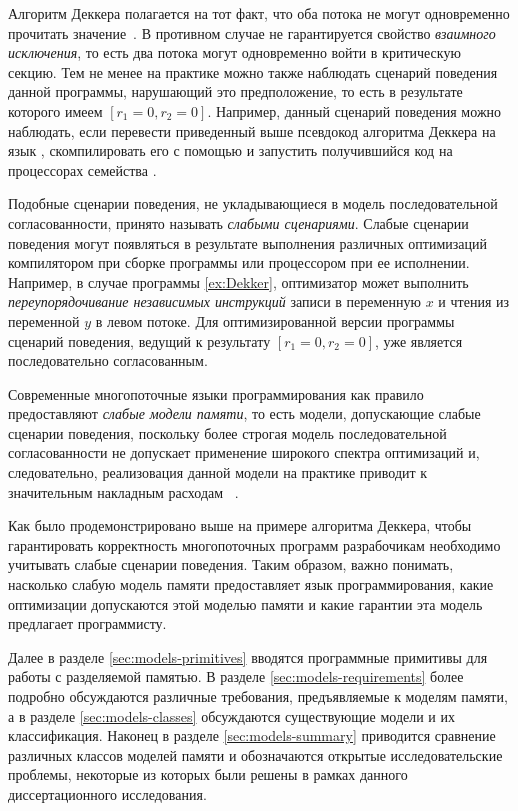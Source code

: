 Алгоритм Деккера полагается на тот факт, что оба 
потока не могут одновременно прочитать значение~.
В противном случае не гарантируется свойство \emph{взаимного исключения}, 
то есть два потока могут одновременно войти в критическую секцию. 
Тем не менее на практике можно также наблюдать
сценарий поведения данной программы, нарушающий это предположение, 
то есть в результате которого имеем ${[r_1=0,r_2=0]}$.
Например, данный сценарий поведения можно наблюдать,
если перевести приведенный выше псевдокод алгоритма Деккера
на язык \CLANG, скомпилировать его с помощью \GCC
и запустить получившийся код на процессорах семейства \IntelX.

Подобные сценарии поведения, 
не укладывающиеся в модель последовательной согласованности, 
принято называть \emph{слабыми сценариями}.
Слабые сценарии поведения могут появляться 
в результате выполнения различных оптимизаций 
компилятором при сборке программы или процессором при ее исполнении. 
Например, в случае программы \ref{ex:Dekker}, оптимизатор может выполнить 
\emph{переупорядочивание независимых инструкций} 
записи в переменную $x$ и чтения из переменной $y$ в левом потоке.
Для оптимизированной версии программы сценарий поведения, 
ведущий к результату ${[r_1=0, r_2=0]}$, уже является последовательно согласованным.

Современные многопоточные языки программирования 
как правило предоставляют \emph{слабые модели памяти},
то есть модели, допускающие слабые сценарии поведения,
поскольку более строгая модель последовательной согласованности
не допускает применение широкого спектра оптимизаций
и, следовательно, реализовация данной модели на практике
приводит к значительным накладным расходам%
~\cite{Marino-al:PLDI11,Singh-al:ISCA12,Liu-al:OOPSLA17,Liu-al:PLDI19}. 

Как было продемонстрировано выше на примере алгоритма Деккера, 
чтобы гарантировать корректность многопоточных программ
разрабочикам необходимо учитывать слабые сценарии поведения.
Таким образом, важно понимать, насколько слабую модель памяти
предоставляет язык программирования, какие оптимизации 
допускаются этой моделью памяти и какие гарантии 
эта модель предлагает программисту. 

Далее в разделе \ref{sec:models-primitives} 
вводятся программные примитивы для работы с разделяемой памятью. 
В разделе \ref{sec:models-requirements} более подробно обсуждаются 
различные требования, предъявляемые к моделям памяти, 
а в разделе \ref{sec:models-classes} обсуждаются существующие модели и их классификация. 
Наконец в разделе \ref{sec:models-summary} приводится сравнение различных 
классов моделей памяти и обозначаются открытые исследовательские проблемы, 
некоторые из которых были решены в рамках данного 
диссертационного исследования. 

